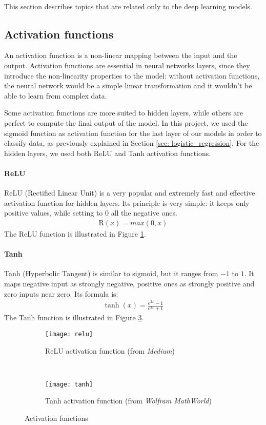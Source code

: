 \paragraph{} This section describes topics that are related only to the deep learning models.

\subsection{Activation functions}
An activation function is a non-linear mapping between the input and the output. Activation functions are essential in neural networks layers, since they introduce the non-linearity properties to the model: without activation functions, the neural network would be a simple linear transformation and it wouldn't be able to learn from complex data.

Some activation functions are more suited to hidden layers, while others are perfect to compute the final output of the model. In this project, we used the sigmoid function as activation function for the last layer of our models in order to classify data, as previously explained in Section \ref{sec: logistic_regression}. For the hidden layers, we used both ReLU and Tanh activation functions.

\paragraph{ReLU} ReLU (Rectified Linear Unit) is a very popular and extremely fast and effective activation function for hidden layers. Its principle is very simple: it keeps only positive values, while setting to 0 all the negative ones.
\begin{align}
    \text{R}(x) = max(0, x)
\end{align}
The ReLU function is illustrated in Figure \ref{fig:relu}.

\paragraph{Tanh} Tanh (Hyperbolic Tangent) is similar to sigmoid, but it ranges from $-1$ to $1$. It maps negative input as strongly negative, positive ones as strongly positive and zero inputs near zero. Its formula is:
\begin{align}
    \tanh{(x)} = \frac{e^{2x} - 1}{e^{2x} + 1}
\end{align}
The Tanh function is illustrated in Figure \ref{fig:tanh}.
\begin{figure}[htbp]
    \centering
    \begin{subfigure}[t]{0.5\textwidth}
		\texttt{[image: relu]}
        \caption{ReLU activation function (from \textit{Medium})}
        \label{fig:relu}
	\end{subfigure}%
	~
	\begin{subfigure}[t]{0.5\textwidth}
		\texttt{[image: tanh]}
        \caption{Tanh activation function (from \textit{Wolfram MathWorld})}
        \label{fig:tanh}
	\end{subfigure}
	\caption{Activation functions}
\end{figure}

